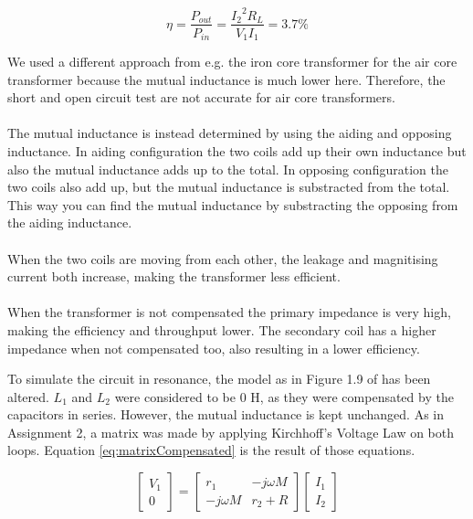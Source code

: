 \documentclass[final]{scrreprt} %
\begin{document}
\begin{equation}
	\eta = \frac{P_{out}}{P_{in}} = \frac{{I_2}^2 R_L}{V_1 I_1} = 3.7\%
	\label{eq:efficiencyMeasured}
\end{equation}

We used a different approach from e.g. the iron core transformer for the air core transformer because the mutual inductance is much lower here. Therefore, the short and open circuit test are not accurate for air core transformers.
\\ \\
The mutual inductance is instead determined by using the aiding and opposing inductance. In aiding configuration the two coils add up their own inductance but also the mutual inductance adds up to the total. In opposing configuration the two coils also add up, but the mutual inductance is substracted from the total. This way you can find the mutual inductance by substracting the opposing from the aiding inductance.
\\ \\
When the two coils are moving from each other, the leakage and magnitising current both increase, making the transformer less efficient.
\\ \\
When the transformer is not compensated the primary impedance is very high, making the efficiency and throughput lower. The secondary coil has a higher impedance when not compensated too, also resulting in a lower efficiency.

To simulate the circuit in resonance, the model as in Figure 1.9 of \cite{epo4-manual} has been altered. $L_1$ and $L_2$ were considered to be 0 H, as they were compensated by the capacitors in series. However, the mutual inductance is kept unchanged. As in Assignment 2, a matrix was made by applying Kirchhoff's Voltage Law on both loops. Equation \ref{eq:matrixCompensated} is the result of those equations.

\begin{equation}
	\begin{bmatrix}
		V_1 \\
		0
	\end{bmatrix} =
	\begin{bmatrix}
		 r_1 & -j \omega M \\
		-j \omega M & r_2 + R
	\end{bmatrix}
	\begin{bmatrix}
		I_1 \\
		I_2
	\end{bmatrix}
	\label{eq:matrixCompensated}
\end{equation}
\end{document}
